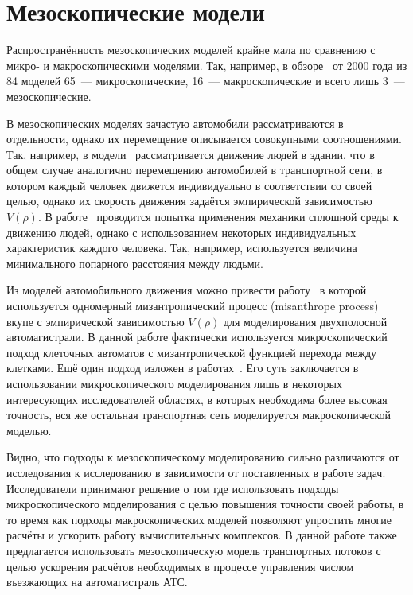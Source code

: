 \section{Мезоскопические модели}\label{subsec:ch1/sec3}
Распространённость мезоскопических моделей крайне мала по сравнению с микро- и макроскопическими моделями.
Так, например, в обзоре~\cite{boxill2000evaluation} от 2000 года из 84 моделей 65~--- микроскопические, 16~--- макроскопические и всего лишь 3~--- мезоскопические.

В мезоскопических моделях зачастую автомобили рассматриваются в отдельности, однако их перемещение описывается совокупными соотношениями.
Так, например, в модели~\cite{lovaas1994modeling} рассматривается движение людей в здании, что в общем случае аналогично перемещению автомобилей в транспортной сети, в котором каждый человек движется индивидуально в соответствии со своей целью, однако их скорость движения задаётся эмпирической зависимостью \(V(\rho)\).
В работе~\cite{treuille2006continuum} проводится попытка применения механики сплошной среды к движению людей, однако с использованием некоторых индивидуальных характеристик каждого человека. Так, например, используется величина минимального попарного расстояния между людьми.

Из моделей автомобильного движения можно привести работу~\cite{kanai2010two} в которой используется одномерный мизантропический процесс (misanthrope process) вкупе с эмпирической зависимостью \(V(\rho)\) для моделирования двухполосной автомагистрали. 
В данной работе фактически используется микроскопический подход клеточных автоматов с мизантропической функцией перехода между клетками.
Ещё один подход изложен в работах~\cite{burghout2005hybrid,magne2000towards}. Его суть заключается в использовании микроскопического моделирования лишь в некоторых интересующих исследователей областях, в которых необходима более высокая точность, вся же остальная транспортная сеть моделируется макроскопической моделью.

Видно, что подходы к мезоскопическому моделированию сильно различаются от исследования к исследованию в зависимости от поставленных в работе задач.
Исследователи принимают решение о том где использовать подходы микроскопического моделирования с целью повышения точности своей работы, в то время как подходы макроскопических моделей позволяют упростить многие расчёты и ускорить работу вычислительных комплексов.
В данной работе также предлагается использовать мезоскопическую модель транспортных потоков с целью ускорения расчётов необходимых в процессе управления числом въезжающих на автомагистраль АТС.


\FloatBarrier 